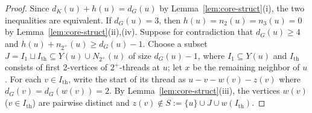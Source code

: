 \documentclass[11pt,a4paper]{article}
\theoremstyle{definition}
\begin{document}
\begin{proof}
Since $d_K(u) + h(u) = d_G(u)$ by Lemma~\ref{lem:core-struct}(i), the two inequalities are equivalent. If $d_G(u) = 3$, then $h(u) = n_2(u) = n_3(u) = 0$ by Lemma~\ref{lem:core-struct}(ii),(iv). Suppose for contradiction that $d_G(u) \ge 4$ and $h(u) + n_{2^+}(u) \ge d_G(u) - 1$. Choose a subset $J = I_1 \sqcup I_{\mathrm{th}} \subseteq Y(u) \cup N_{2^+}(u)$ of size $d_G(u) - 1$, where $I_1 \subseteq Y(u)$ and $I_{\mathrm{th}}$ consists of first $2$-vertices of $2^+$-threads at $u$; let $x$ be the remaining neighbor of $u$. For each $v \in I_{\mathrm{th}}$, write the start of its thread as $u - v - w(v) - z(v)$ where $d_G(v) = d_G(w(v)) = 2$. By Lemma~\ref{lem:core-struct}(iii), the vertices $w(v)$ ($v \in I_{\mathrm{th}}$) are pairwise distinct and $z(v) \notin S := \{u\} \cup J \cup w(I_{\mathrm{th}})$.


\end{proof}
\end{document}
